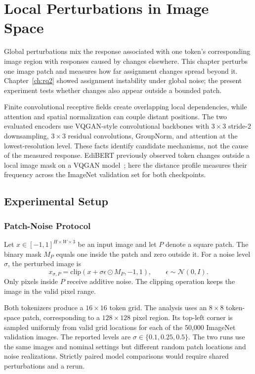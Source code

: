 \chapter{Local Perturbations in Image Space}
\label{ch:rq3}

Global perturbations mix the response associated with one token's corresponding
image region with responses caused by changes elsewhere. This chapter perturbs
one image patch and measures how far assignment changes spread beyond it.
Chapter~\ref{ch:rq2} showed assignment instability under global noise; the
present experiment tests whether changes also appear outside a bounded patch.

Finite convolutional receptive fields create overlapping local dependencies,
while attention and spatial normalization can couple distant positions. The
two evaluated encoders use VQGAN-style convolutional backbones with
$3\times3$ stride-2 downsampling, $3\times3$ residual convolutions,
GroupNorm, and attention at the lowest-resolution level. These facts identify
candidate mechanisms, not the cause of the measured response. EdiBERT
previously observed token changes outside a local image mask on a VQGAN
model~\cite{issenhuth2021edibert}; here the distance profile measures their
frequency across the ImageNet validation set for both checkpoints.

\section{Experimental Setup}
\label{sec:rq3_setup}

\subsection{Patch-Noise Protocol}
\label{subsec:rq3_patch_noise_protocol}

Let $x \in [-1,1]^{H \times W \times 3}$ be an input image and let $P$ denote
a square patch. The binary mask $M_P$ equals one inside the patch and zero
outside it. For a noise level $\sigma$, the perturbed image is
\begin{equation}
    x_{\sigma,P}
    =
    \mathrm{clip}\!\left(x + \sigma \epsilon \odot M_P, -1, 1\right),
    \qquad
    \epsilon \sim \mathcal{N}(0,I).
    \label{eq:rq3_patch_noise}
\end{equation}
Only pixels inside $P$ receive additive noise. The clipping operation keeps the image in the valid pixel range.

Both tokenizers produce a $16\times16$ token grid. The analysis uses an
$8\times8$ token-space patch, corresponding to a $128\times128$ pixel region.
Its top-left corner is sampled uniformly from valid grid locations for each of
the 50,000 ImageNet validation images. The reported levels are
$\sigma\in\{0.1,0.25,0.5\}$. The two runs use the same images and nominal
settings but different random patch locations and noise realizations. Strictly
paired model comparisons would require shared perturbations and a rerun.

